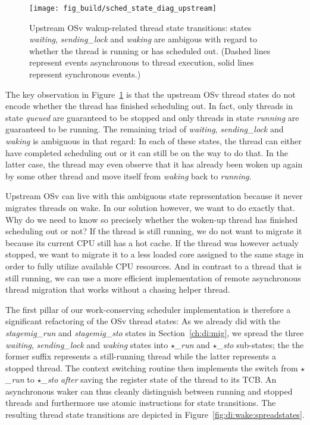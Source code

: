 \documentclass[12pt,a4paper]{book}
\begin{document}
\begin{figure}[H]
    \centering
    \texttt{[image: fig\_build/sched\_state\_diag\_upstream]}
    \caption{Upstream OSv wakup-related thread state transitions: states \textit{waiting}, \textit{sending\_lock} and \textit{waking} are ambigous with regard to whether the thread is running or has scheduled out.
    (Dashed lines represent events asynchronous to thread execution, solid lines represent synchronous events.)}
    \label{fig:di:wake:upstreamstates}
\end{figure}

The key observation in Figure~\ref{fig:di:wake:upstreamstates} is that the upstream OSv thread states do not encode whether the thread has finished scheduling out.
In fact, only threads in state \textit{queued} are guaranteed to be stopped and only threads in state \textit{running} are guaranteed to be running.
The remaining triad of \textit{waiting}, \textit{sending\_lock} and \textit{waking} is ambiguous in that regard:
In each of these states, the thread can either have completed scheduling out or it can still be on the way to do that.
In the latter case, the thread may even observe that it has already been woken up again by some other thread and move itself from \textit{waking} back to \textit{running}.

Upstream OSv can live with this ambiguous state representation because it never migrates threads on wake.
In our solution however, we want to do exactly that.
Why do we need to know so precisely whether the woken-up thread has finished scheduling out or not?
If the thread is still running, we do not want to migrate it because its current CPU still has a hot cache.
If the thread was however actualy stopped, we want to migrate it to a less loaded core assigned to the same stage in order to fully utilize available CPU resources.
And in contrast to a thread that is still running, we can use a more efficient implementation of remote asynchronous thread migration that works without a chasing helper thread.

The first pillar of our work-conserving scheduler implementation is therefore a significant refactoring of the OSv thread states:
As we already did with the \textit{stagemig\_run} and \textit{stagemig\_sto} states in Section~\ref{ch:di:mig},
we spread the three \textit{waiting}, \textit{sending\_lock} and \textit{waking} states into \textit{$\star$\_run} and \textit{$\star$\_sto} sub-states; the the former suffix represents a still-running thread while the latter represents a stopped thread.
The context switching routine then implements the switch from \textit{$\star$\_run} to \textit{$\star$\_sto} \emph{after} saving the register state of the thread to its TCB.
An asynchronous waker can thus cleanly distinguish between running and stopped threads and furthermore use atomic instructions for state transitions.
The resulting thread state transitions are depicted in Figure~\ref{fig:di:wake:spreadstates}.
\end{document}
